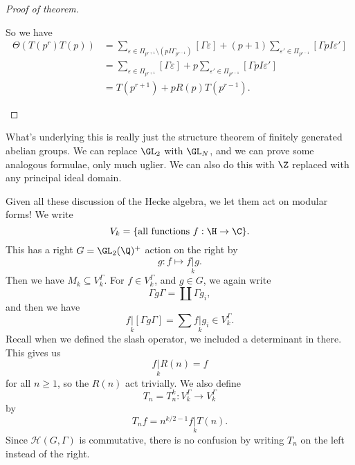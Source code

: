 \documentclass[a4paper]{article}
\begin{document}
\begin{proof}[Proof of theorem]
\begin{enumerate}
      So we have
      \begin{align*}
        \Theta(T(p^r)T(p)) &= \sum_{\varepsilon \in \Pi_{p^{r + 1}} \setminus (pI \Gamma_{p^{r - 1}})} [\Gamma \varepsilon] + (p + 1) \sum_{\varepsilon' \in \Pi_{p^{r - 1}}} [\Gamma pI \varepsilon']\\
        &= \sum_{\varepsilon \in \Pi_{p^{r + 1}}} [\Gamma \varepsilon] + p \sum_{\varepsilon' \in \Pi_{p^{r - 1}}} [\Gamma pI \varepsilon'] \\
        &= T(p^{r + 1}) + p R(p) T(p^{r - 1}).
      \end{align*}
  \end{enumerate}
\end{proof}
What's underlying this is really just the structure theorem of finitely generated abelian groups. We can replace $\GL_2$ with $\GL_N$, and we can prove some analogous formulae, only much uglier. We can also do this with $\Z$ replaced with any principal ideal domain.

Given all these discussion of the Hecke algebra, we let them act on modular forms! We write
\[
  V_k = \{\text{all functions } f: \H \to \C\}.
\]
This has a right $G = \GL_2(\Q)^+$ action on the right by
\[
  g: f \mapsto f \underset{k}{|}g.
\]
Then we have $M_k \subseteq V_k^\Gamma$. For $f \in V_k^\Gamma$, and $g \in G$, we again write
\[
  \Gamma g \Gamma = \coprod \Gamma g_i,
\]
and then we have
\[
  f \underset{k}{|} [\Gamma g \Gamma] = \sum f\underset{k}{|}g_i \in V_k^\Gamma.
\]
Recall when we defined the slash operator, we included a determinant in there. This gives us
\[
  f\underset{k}{|} R(n) = f
\]
for all $n \geq 1$, so the $R(n)$ act trivially. We also define
\[
  T_n = T_n^k: V_k^\Gamma \to V_k^\Gamma
\]
by
\[
  T_n f = n^{k/2 - 1} f \underset{k}{|} T(n).
\]
Since $\mathcal{H}(G, \Gamma)$ is commutative, there is no confusion by writing $T_n$ on the left instead of the right.
\end{document}
